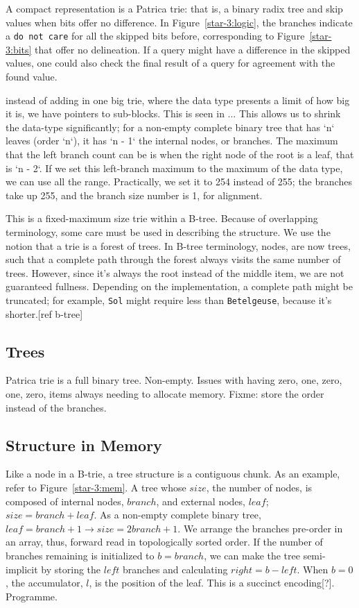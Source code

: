 \documentclass[12pt]{article}
\newcommand{\code}[1]{\colorbox{light-gray}{\texttt{#1}}}
\begin{document}
A compact representation is a Patrica trie\cite{morrison1968patricia}: that is, a binary radix tree and skip values when bits offer no difference. In Figure~\ref{star-3:logic}, the branches indicate a \code{do not care} for all the skipped bits before, corresponding to Figure~\ref{star-3:bits} that offer no delineation. If a query might have a difference in the skipped values, one could also check the final result of a query for agreement with the found value.

instead of adding in one big trie, where the data type presents a limit of how big it is, we have pointers to sub-blocks. This is seen in ... This allows us to shrink the data-type significantly; for a non-empty complete binary tree that has `n` leaves (order `n`), it has `n - 1` the internal nodes, or branches. The maximum that the left branch count can be is when the right node of the root is a leaf, that is `n - 2`. If we set this left-branch maximum to the maximum of the data type, we can use all the range. Practically, we set it to 254 instead of 255; the branches take up 255, and the branch size number is 1, for alignment.

This is a fixed-maximum size trie within a B-tree. Because of overlapping terminology, some care must be used in describing the structure. We use the notion that a trie is a forest of trees. In B-tree terminology, nodes, are now trees, such that a complete path through the forest always visits the same number of trees. However, since it's always the root instead of the middle item, we are not guaranteed fullness. Depending on the implementation, a complete path might be truncated; for example, \code{Sol} might require less than \code{Betelgeuse}, because it's shorter.[ref b-tree]

\subsection{Trees}

Patrica trie is a full binary tree. Non-empty. Issues with having zero, one, zero, one, zero, items always needing to allocate memory. Fixme: store the order instead of the branches.

\subsection{Structure in Memory}

Like a node in a B-trie, a tree structure is a contiguous chunk. As an example, refer to Figure~\ref{star-3:mem}. A tree whose $\mathit{size}$, the number of nodes, is composed of internal nodes, $\mathit{branch}$, and external nodes, $\mathit{leaf}$; $\mathit{size} = \mathit{branch} + \mathit{leaf}$. As a non-empty complete binary tree, $\mathit{leaf} = \mathit{branch} + 1 \rightarrow \mathit{size} = 2\mathit{branch} + 1$. We arrange the branches pre-order in an array, thus, forward read in topologically sorted order. If the number of branches remaining is initialized to $b = \mathit{branch}$, we can make the tree semi-implicit by storing the $\mathit{left}$ branches and calculating $\mathit{right} = b - \mathit{left}$. When $b = 0$, the accumulator, $l$, is the position of the leaf. This is a succinct encoding[?]. Programme.
\end{document}
